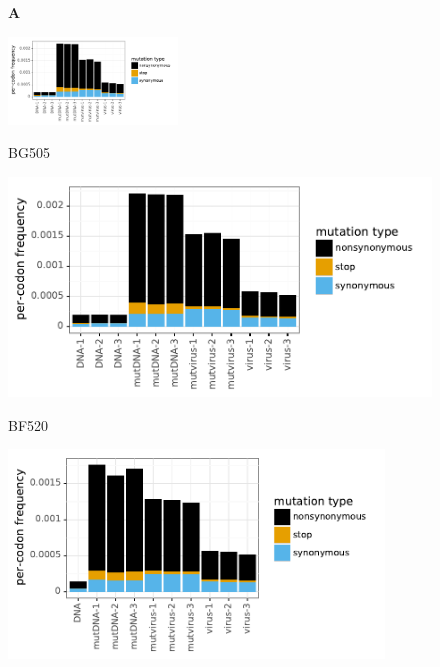 \documentclass[9pt,lineno]{elife}
\begin{document}
\begin{figure}
\begin{minipage}[t]{0.34\textwidth}
{\bf \Large A} \\ 
\centerline{{\includegraphics[clip=true, trim=4.3in 1.4in 0in 0.48in, width=0.4\textwidth]{figures/BG505_avgmutfreqs.pdf}}} 
\centerline{\small BG505}
\includegraphics[clip=true, trim=0in 0in 1.7in 0in, width=\textwidth]{figures/BG505_avgmutfreqs.pdf}
\centerline{\small BF520}
\includegraphics[clip=true, trim=0in 0in 1.7in 0in, width=0.89\textwidth]{figures/BF520_avgmutfreqs.pdf}

\end{minipage}
\end{figure}
\end{document}
